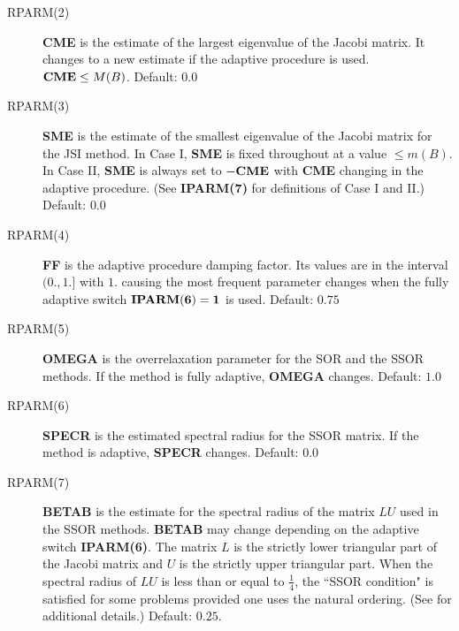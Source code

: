 \begin{description}
 \item[RPARM(2)] {\bf CME} is the estimate of the largest eigenvalue of 
                 the Jacobi matrix.  It changes to a new estimate if the 
                 adaptive procedure is used.  ${\bf CME} \leq M(B)$.
                 Default: $0.0$

 \item[RPARM(3)] {\bf SME} is the estimate of the smallest eigenvalue of 
                 the Jacobi matrix for the JSI method.  In Case I, 
                 {\bf SME} is fixed throughout at a value $\leq m(B)$.
                 In Case II, {\bf SME} is always set to ${\bf -CME}$
                 with {\bf CME} changing in the adaptive procedure.  (See
                 {\bf IPARM(7)} for definitions of Case I and II.)
                 Default: $0.0$

 \item[RPARM(4)] {\bf FF} is the adaptive procedure damping factor.  Its
                 values are in the interval $(0.,1.]$ with $1.$ causing 
                 the most frequent parameter changes when the fully 
                 adaptive switch ${\bf IPARM(6)=1}$ is used.  
                 Default: $0.75$

 \item[RPARM(5)] {\bf OMEGA} is the overrelaxation parameter for the SOR 
                 and the SSOR methods.  If the method is fully adaptive, 
                 {\bf OMEGA} changes.  Default: $1.0$
 
 \item[RPARM(6)] {\bf SPECR} is the estimated spectral radius for the 
                 SSOR matrix.  If the method is adaptive, {\bf SPECR} 
                 changes.  Default: $0.0$
     
 \item[RPARM(7)] {\bf BETAB} is the estimate for the spectral radius of the
                 matrix $LU$ used in the SSOR methods.  {\bf BETAB} may 
                 change depending on the adaptive switch {\bf IPARM(6)}.
                 The matrix $L$ is the strictly lower triangular part of 
                 the Jacobi matrix and $U$ is the strictly upper triangular 
                 part.  When the spectral radius of $LU$ is less than or 
                 equal to $\frac{1}{4}$, the ``SSOR condition" is satisfied 
                 for some problems provided one uses the natural ordering.
                 (See \cite{1,10} for additional details.)  Default: $0.25$.
   

\end{description}

